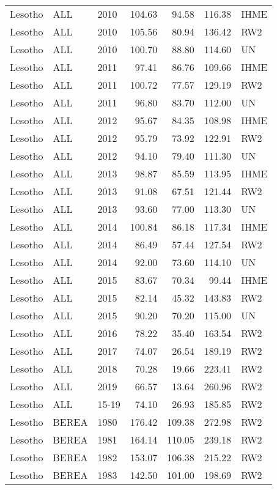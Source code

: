 \begin{longtable}{lllrrrl}
  Lesotho & ALL & 2010 & 104.63 & 94.58 & 116.38 & IHME \\ 
  Lesotho & ALL & 2010 & 105.56 & 80.94 & 136.42 & RW2 \\ 
  Lesotho & ALL & 2010 & 100.70 & 88.80 & 114.60 & UN \\ 
  Lesotho & ALL & 2011 & 97.41 & 86.76 & 109.66 & IHME \\ 
  Lesotho & ALL & 2011 & 100.72 & 77.57 & 129.19 & RW2 \\ 
  Lesotho & ALL & 2011 & 96.80 & 83.70 & 112.00 & UN \\ 
  Lesotho & ALL & 2012 & 95.67 & 84.35 & 108.98 & IHME \\ 
  Lesotho & ALL & 2012 & 95.79 & 73.92 & 122.91 & RW2 \\ 
  Lesotho & ALL & 2012 & 94.10 & 79.40 & 111.30 & UN \\ 
  Lesotho & ALL & 2013 & 98.87 & 85.59 & 113.95 & IHME \\ 
  Lesotho & ALL & 2013 & 91.08 & 67.51 & 121.44 & RW2 \\ 
  Lesotho & ALL & 2013 & 93.60 & 77.00 & 113.30 & UN \\ 
  Lesotho & ALL & 2014 & 100.84 & 86.18 & 117.34 & IHME \\ 
  Lesotho & ALL & 2014 & 86.49 & 57.44 & 127.54 & RW2 \\ 
  Lesotho & ALL & 2014 & 92.00 & 73.60 & 114.10 & UN \\ 
  Lesotho & ALL & 2015 & 83.67 & 70.34 & 99.44 & IHME \\ 
  Lesotho & ALL & 2015 & 82.14 & 45.32 & 143.83 & RW2 \\ 
  Lesotho & ALL & 2015 & 90.20 & 70.20 & 115.00 & UN \\ 
  Lesotho & ALL & 2016 & 78.22 & 35.40 & 163.54 & RW2 \\ 
  Lesotho & ALL & 2017 & 74.07 & 26.54 & 189.19 & RW2 \\ 
  Lesotho & ALL & 2018 & 70.28 & 19.66 & 223.41 & RW2 \\ 
  Lesotho & ALL & 2019 & 66.57 & 13.64 & 260.96 & RW2 \\ 
  Lesotho & ALL & 15-19 & 74.10 & 26.93 & 185.85 & RW2 \\ 
  Lesotho & BEREA & 1980 & 176.42 & 109.38 & 272.98 & RW2 \\ 
  Lesotho & BEREA & 1981 & 164.14 & 110.05 & 239.18 & RW2 \\ 
  Lesotho & BEREA & 1982 & 153.07 & 106.38 & 215.22 & RW2 \\ 
  Lesotho & BEREA & 1983 & 142.50 & 101.00 & 198.69 & RW2 \\ 

\end{longtable}
